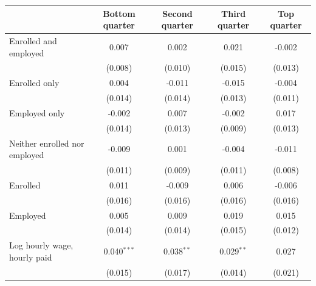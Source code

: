 \begin{tabular}{lcccc}
\toprule
 & Bottom quarter & Second quarter & Third quarter & Top quarter \\
\midrule
Enrolled and employed & 0.007 & 0.002 & 0.021 & -0.002 \\
 & (0.008) & (0.010) & (0.015) & (0.013) \\
Enrolled only & 0.004 & -0.011 & -0.015 & -0.004 \\
 & (0.014) & (0.014) & (0.013) & (0.011) \\
Employed only & -0.002 & 0.007 & -0.002 & 0.017 \\
 & (0.014) & (0.013) & (0.009) & (0.013) \\
Neither enrolled nor employed & -0.009 & 0.001 & -0.004 & -0.011 \\
 & (0.011) & (0.009) & (0.011) & (0.008) \\
Enrolled & 0.011 & -0.009 & 0.006 & -0.006 \\
 & (0.016) & (0.016) & (0.016) & (0.016) \\
Employed & 0.005 & 0.009 & 0.019 & 0.015 \\
 & (0.014) & (0.014) & (0.015) & (0.012) \\
Log hourly wage, hourly paid & 0.040$^{***}$ & 0.038$^{**}$ & 0.029$^{**}$ & 0.027 \\
 & (0.015) & (0.017) & (0.014) & (0.021) \\
\bottomrule
\end{tabular}
